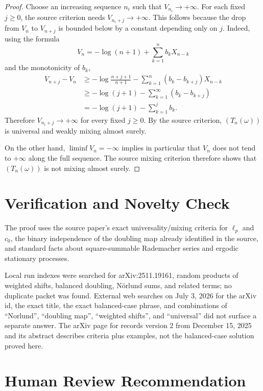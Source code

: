 \documentclass[11pt]{article}
\begin{document}
\begin{proof}
Choose an increasing sequence \(n_i\) such that \(V_{n_i}\to+\infty\).  For
each fixed \(j\ge0\), the source criterion needs \(V_{n_i+j}\to+\infty\).  This
follows because the drop from \(V_n\) to \(V_{n+j}\) is bounded below by a
constant depending only on \(j\).  Indeed, using the formula
\[
  V_n=-\log(n+1)+\sum_{k=1}^{n}b_k X_{n-k}
\]
and the monotonicity of \(b_k\),
\[
\begin{aligned}
  V_{n+j}-V_n
  &\ge -\log\frac{n+j+1}{n+1}
      -\sum_{k=1}^{n}(b_k-b_{k+j})X_{n-k}  \\
  &\ge -\log(j+1)-\sum_{k=1}^{\infty}(b_k-b_{k+j})  \\
  &= -\log(j+1)-\sum_{k=1}^{j}b_k .
\end{aligned}
\]
Therefore \(V_{n_i+j}\to+\infty\) for every fixed \(j\ge0\).  By the source
criterion, \((T_n(\omega))\) is universal and weakly mixing almost surely.

On the other hand, \(\liminf V_n=-\infty\) implies in particular that
\(V_n\) does not tend to \(+\infty\) along the full sequence.  The source
mixing criterion therefore shows that \((T_n(\omega))\) is not mixing almost
surely.
\end{proof}

\section*{Verification and Novelty Check}

The proof uses the source paper's exact universality/mixing criteria for
\(\ell_p\) and \(c_0\), the binary independence of the doubling map already
identified in the source, and standard facts about square-summable Rademacher
series and ergodic stationary processes.

Local run indexes were searched for arXiv:2511.19161, random products of
weighted shifts, balanced doubling, Nörlund sums, and related terms; no
duplicate packet was found.  External web searches on July 3, 2026 for the
arXiv id, the exact title, the exact balanced-case phrase, and combinations of
``Norlund'', ``doubling map'', ``weighted shifts'', and ``universal'' did not
surface a separate answer.  The arXiv page for \cite{Gillet} records version 2
from December 15, 2025 and its abstract describes criteria plus examples, not
the balanced-case solution proved here.

\section*{Human Review Recommendation}
\end{document}
